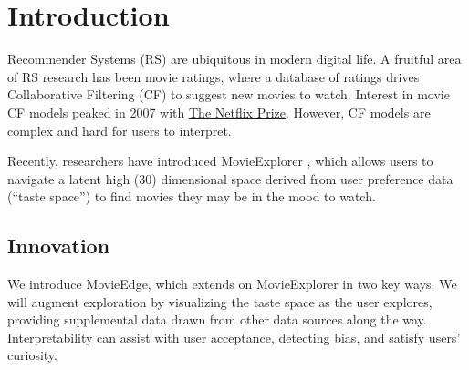 \documentclass[sigchi, 12pt, nonacm=true, timestamp=true, screen=true]{acmart}
\begin{document}



\maketitle

\section{Introduction}
Recommender Systems (RS) are ubiquitous in modern digital life. A fruitful area of RS research has been movie ratings, where a database of ratings drives Collaborative Filtering (CF) to suggest new movies to watch. Interest in movie CF models peaked in 2007 with \href{https://www.netflixprize.com/}{The Netflix Prize}. However, CF models are complex and hard for users to interpret.

Recently, researchers have introduced MovieExplorer \cite{taijala2018movieexplorer}, which allows users to navigate a latent high (30) dimensional space derived from user preference data (“taste space”) to find movies they may be in the mood to watch. 

\subsection{Innovation}

We introduce MovieEdge, which extends on MovieExplorer in two key ways.  We will augment exploration by visualizing the taste space as the user explores, providing supplemental data drawn from other data sources \cite{openMovieDB} along the way. Interpretability  \cite{Molnar2019interpretable} can assist with user acceptance, detecting bias, and satisfy users’ curiosity. 
\end{document}

